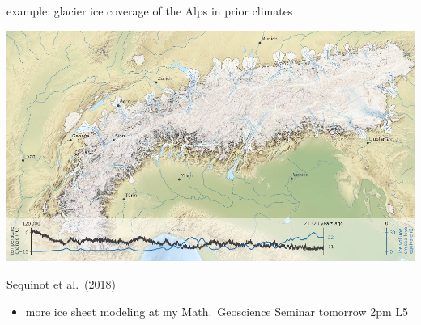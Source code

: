 \documentclass[svgnames,
               hyperref={colorlinks,citecolor=DeepPink4,linkcolor=FireBrick,urlcolor=Maroon},
               usepdftitle=false]  %
               {beamer}
\begin{document}
\begin{frame}{example: glacier ice coverage of the Alps in prior climates}

\includegraphics[width=1.02\textwidth]{images/alps-seguinot2018.png}

\vspace{-2mm}
\hfill {\tiny Sequinot et al.~(2018)}

{\footnotesize
\begin{itemize}
\item<2> more ice sheet modeling at my Math.~Geoscience Seminar tomorrow 2pm L5
\end{itemize}
}
\end{frame}
\end{document}
